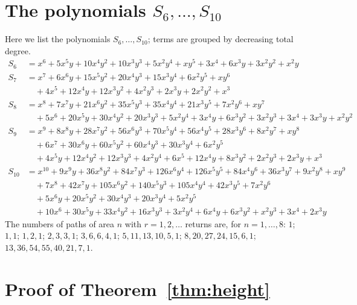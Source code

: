\documentclass[11pt,reqno]{amsart}
\numberwithin{equation}{section}
\theoremstyle{remark}
\begin{document}
\section{The polynomials \texorpdfstring{$S_6,\dots,S_{10}$}{S6,...,S10}}\label{app:poly}
Here we list the polynomials $S_6,\dots,S_{10}$; terms are grouped by decreasing total
degree.
\begin{align*}
S_6&=x^6+5x^5y+10x^4y^2+10x^3y^3+5x^2y^4+xy^5+3x^4+6x^3y+3x^2y^2+x^2y\\
S_7&=x^7+6x^6y+15x^5y^2+20x^4y^3+15x^3y^4+6x^2y^5+xy^6\\
   &\quad+4x^5+12x^4y+12x^3y^2+4x^2y^3+2x^3y+2x^2y^2+x^3\\
S_8&=x^8+7x^7y+21x^6y^2+35x^5y^3+35x^4y^4+21x^3y^5+7x^2y^6+xy^7\\
   &\quad+5x^6+20x^5y+30x^4y^2+20x^3y^3+5x^2y^4+3x^4y+6x^3y^2+3x^2y^3+3x^4+3x^3y+x^2y^2\\
S_9&=x^9+8x^8y+28x^7y^2+56x^6y^3+70x^5y^4+56x^4y^5+28x^3y^6+8x^2y^7+xy^8\\
   &\quad+6x^7+30x^6y+60x^5y^2+60x^4y^3+30x^3y^4+6x^2y^5\\
   &\quad+4x^5y+12x^4y^2+12x^3y^3+4x^2y^4+6x^5+12x^4y+8x^3y^2+2x^2y^3+2x^3y+x^3\\
S_{10}&=x^{10}+9x^9y+36x^8y^2+84x^7y^3+126x^6y^4+126x^5y^5+84x^4y^6+36x^3y^7+9x^2y^8+xy^9\\
   &\quad+7x^8+42x^7y+105x^6y^2+140x^5y^3+105x^4y^4+42x^3y^5+7x^2y^6\\
   &\quad+5x^6y+20x^5y^2+30x^4y^3+20x^3y^4+5x^2y^5\\
   &\quad+10x^6+30x^5y+33x^4y^2+16x^3y^3+3x^2y^4+6x^4y+6x^3y^2+x^2y^3+3x^4+2x^3y
\end{align*}
The numbers of paths of area $n$ with $r=1,2,\dots$ returns are, for $n=1,\dots,8$:
$1$; $1,1$; $1,2,1$; $2,3,3,1$; $3,6,6,4,1$; $5,11,13,10,5,1$; $8,20,27,24,15,6,1$;
$13,36,54,55,40,21,7,1$.

\section{Proof of Theorem~\ref{thm:height}}\label{app:proof}
\end{document}
